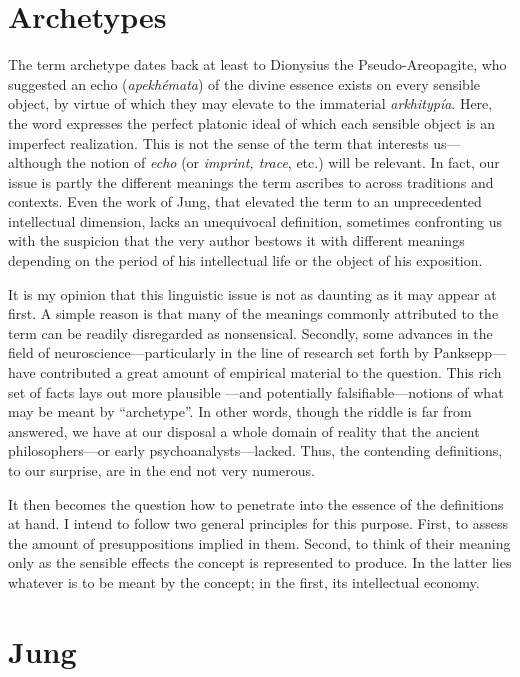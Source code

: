 \documentclass[a4paper]{article}
\begin{document}
    \section{Archetypes}

    The term archetype dates back at least to Dionysius the
    Pseudo-Areopagite, who suggested an echo (\textit{apekhémata}) of the divine
    essence exists on every sensible object, by virtue of which they may elevate
    to the immaterial \textit{arkhitypía}. Here, the word expresses the perfect
    platonic ideal of which each sensible object is an imperfect realization.
    This is not the sense of the term that interests us---although the notion of
    \textit{echo} (or \textit{imprint, trace}, etc.) will be relevant. In fact,
    our issue is partly the different meanings the term ascribes to across
    traditions and contexts. Even the work of Jung, that elevated the term to an
    unprecedented intellectual dimension, lacks an unequivocal definition,
    sometimes confronting us with the suspicion that the very author
    bestows it with different meanings depending on the period of his
    intellectual life or the object of his exposition. 

    It is my opinion that this linguistic issue is not as daunting as it may
    appear at first. A simple reason is that many of the meanings commonly
    attributed to the term can be readily disregarded as nonsensical. Secondly,
    some advances in the field of neuroscience—particularly in the line of
    research set forth by Panksepp—have contributed a great amount of empirical
    material to the question. This rich set of facts lays out more plausible
    —and potentially falsifiable—notions of what may be meant by “archetype”. In
    other words, though the riddle is far from answered, we have at our disposal
    a whole domain of reality that the ancient philosophers—or early
    psychoanalysts—lacked. Thus, the contending definitions, to our surprise,
    are in the end not very numerous. 

    It then becomes the question how to penetrate into the
    essence of the definitions at hand. I intend to follow two general
    principles for this purpose. First, to assess the amount of presuppositions
    implied in them. Second, to think of their meaning only as the sensible
    effects the concept is represented to produce. In the latter lies whatever
    is to be meant by the concept; in the first, its intellectual economy. 
    
    \section{Jung}
\end{document}

